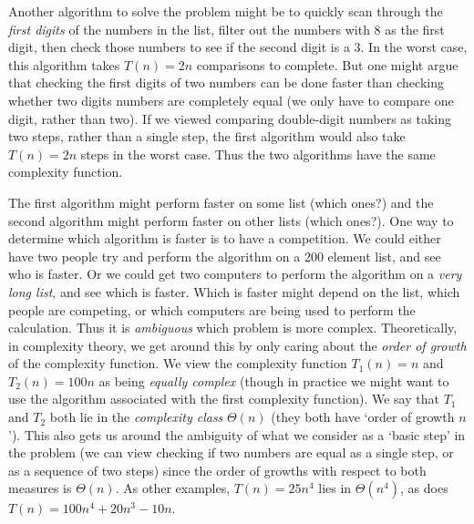 \documentclass{article}
\theoremstyle{plain}
\theoremstyle{remark}
\theoremstyle{definition}
\begin{document}
Another algorithm to solve the problem might be to quickly scan through the \emph{first digits} of the numbers in the list, filter out the numbers with $8$ as the first digit, then check those numbers to see if the second digit is a $3$. In the worst case, this algorithm takes $T(n) = 2n$ comparisons to complete. But one might argue that checking the first digits of two numbers can be done faster than checking whether two digits numbers are completely equal (we only have to compare one digit, rather than two). If we viewed comparing double-digit numbers as taking two steps, rather than a single step, the first algorithm would also take $T(n) = 2n$ steps in the worst case. Thus the two algorithms have the same complexity function.

The first algorithm might perform faster on some list (which ones?) and the second algorithm might perform faster on other lists (which ones?). One way to determine which algorithm is faster is to have a competition. We could either have two people try and perform the algorithm on a 200 element list, and see who is faster. Or we could get two computers to perform the algorithm on a \emph{very long list}, and see which is faster. Which is faster might depend on the list, which people are competing, or which computers are being used to perform the calculation. Thus it is \emph{ambiguous} which problem is more complex. Theoretically, in complexity theory, we get around this by only caring about the \emph{order of growth} of the complexity function. We view the complexity function $T_1(n) = n$ and $T_2(n) = 100n$ as being \emph{equally complex} (though in practice we might want to use the algorithm associated with the first complexity function). We say that $T_1$ and $T_2$ both lie in the \emph{complexity class} $\Theta(n)$ (they both have `order of growth $n$'). This also gets us around the ambiguity of what we consider as a `basic step' in the problem (we can view checking if two numbers are equal as a single step, or as a sequence of two steps) since the order of growths with respect to both measures is $\Theta(n)$. As other examples, $T(n) = 25 n^4$ lies in $\Theta(n^4)$, as does $T(n) = 100 n^4 + 20 n^3 - 10 n$.
\end{document}
